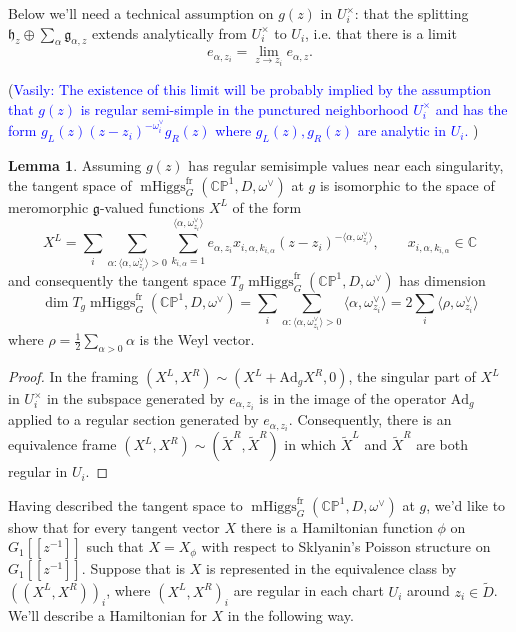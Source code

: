 \documentclass[11pt, oneside, reqno]{amsart}
\theoremstyle{definition} \newtheorem{definition}{Definition}[section]
\newtheorem{lemma}[definition]{Lemma}
\theoremstyle{definition} \newtheorem{remark}[definition]{Remark}
\theoremstyle{definition} \newtheorem{remarks}[definition]{Remarks}
\theoremstyle{definition} \newtheorem{question}[definition]{Question}
\theoremstyle{definition} \newtheorem*{note}{Note}
\theoremstyle{definition} \newtheorem{example}[definition]{Example}
\theoremstyle{definition} \newtheorem{examples}[definition]{Examples}
\renewcommand{\gg}{\mathfrak{g}}
\newcommand{\hh}{\mathfrak{h}}
\newcommand{\bb}[1]{\mathbb{#1}}
\newcommand{\mr}[1]{\mathrm{#1}}
\DeclareMathOperator{\mhiggs}{mHiggs}
\newcommand{\fr}{\mathrm{fr}}
\newcommand{\Ad}{\mr{Ad}}
\newcommand{\vasily}[1]{(\textcolor{blue}{Vasily: #1})}
\begin{document}
Below we'll need a technical assumption on $g(z)$ in $U_{i}^{\times}$: that the splitting
$\hh_{z} \oplus \sum_{\alpha} \gg_{\alpha,z}$ extends analytically from $U_{i}^{\times}$ to $U_{i}$,
i.e. that there is a limit 
 \[ e_{\alpha, z_i} = \lim_{z \to z_i} e_{\alpha, z}.\] 
 
\vasily{The existence of this limit will be probably implied by the
  assumption that $g(z)$ is regular semi-simple in the punctured
  neighborhood $U_{i}^{\times}$ and has the form $ g_L(z) (z-z_i)^{-\omega_{i}^{\vee}} g_{R}(z)$
  where $g_{L}(z), g_{R}(z)$ are analytic in $U_i$. } 


\begin{lemma}
  Assuming $g(z)$ has regular semisimple values near each singularity, the tangent space of $\mhiggs^\fr_G(\bb{CP}^1, D, \omega^\vee)$ at $g$ is isomorphic to the space of meromorphic $\gg$-valued functions $X^{L}$ of the form
  \begin{equation}
\label{eq:XL}
    X^{L} = \sum_{i} \sum_{\alpha: \langle \alpha, \omega_{z_i}^{\vee} \rangle > 0 }
    \sum_{k_{i, \alpha} = 1}^{ \langle \alpha , \omega_{z_i}^{\vee} \rangle} e_{\alpha,{z_i}} x_{i, \alpha, k_{i, \alpha}} (z - z_i)^{-\langle \alpha, \omega_{z_i}^{\vee}\rangle }, \qquad x_{i, \alpha, k_{i, \alpha}} \in \mathbb{C}
  \end{equation}
  and consequently the tangent space $T_g \mhiggs^\fr_G(\bb{CP}^1, D, \omega^\vee)$ has dimension 
  \begin{equation}
\dim T_g \mhiggs^\fr_G(\bb{CP}^1, D, \omega^\vee) = \sum_{i} \sum_{\alpha: \langle \alpha, \omega_{z_i}^{\vee} \rangle > 0 } \langle \alpha, \omega_{z_i}^{\vee} \rangle = 2 \sum_{i} \langle \rho, \omega^{\vee}_{z_i}\rangle 
  \end{equation}
  where $\rho = \frac 1 2 \sum_{\alpha > 0} \alpha$ is the Weyl vector.
\end{lemma}

\begin{proof}
  In the framing $(X^{L}, X^{R}) \sim (X^{L} + \Ad_{g} X^{R}, 0 )$, the singular
  part of $X^{L}$ in $U_{i}^{\times}$ in the subspace generated by $e_{\alpha, z_i}$
  is in the image of the operator $\Ad_{g}$ applied to a regular section generated by $e_{\alpha, z_i}$.  Consequently, there is an equivalence frame $(X^{L}, X^{R}) \sim (\tilde X^{R}, \tilde X^{R})$  in which $\tilde X^{L}$ and $\tilde X^{R}$ are both regular in $U_{i}$. 
\end{proof}

Having described the tangent space to $\mhiggs^\fr_G(\bb{CP}^1, D, \omega^\vee)$ at $g$, we'd like to show that for every tangent vector $X$ there is a Hamiltonian function $\phi$ on $G_1[[z^{-1}]]$ such that $X = X_\phi$ with respect to Sklyanin's Poisson structure on $G_1[[z^{-1}]]$.  Suppose that is $X$ is represented in the equivalence class by $((X^{L}, X^{R}))_{i}$, where $(X^{L}, X^{R})_{i}$ are regular in each chart $U_i$ around $z_i \in \tilde D$.  We'll describe a Hamiltonian for $X$ in the following way.
\end{document}
